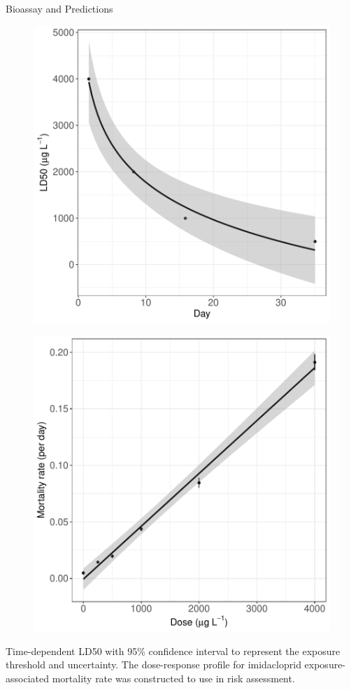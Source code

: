 \documentclass[final,t]{beamer}
\begin{document}
\begin{frame}[fragile]
\begin{columns}[t]
\begin{column}{0.16\linewidth}
\begin{block}{Bioassay and Predictions}
        
        \begin{figure}[htb]
        \includegraphics[width=.8\columnwidth]{beamerpostertest-fig3}
        \end{figure}
        
        \begin{figure}[htb]
        \includegraphics[width=.8\columnwidth]{beamerpostertest-fig4}
        \end{figure}
        Time-dependent LD50 with 95\% confidence interval to represent the exposure threshold and uncertainty. The dose-response profile for imidacloprid exposure-associated mortality rate was constructed to use in risk assessment.
      \end{block}
    \end{column}%


\end{columns}
\end{frame}
\end{document}
